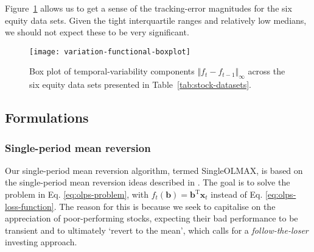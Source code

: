 Figure~\ref{fig:variation-functional-boxplot} allows us to get a sense of the tracking-error magnitudes for the six equity data sets. Given the tight interquartile ranges and relatively low medians, we should not expect these to be very significant.
\begin{figure}[H]
\caption{Box plot of temporal-variability components $\Vert f_t - f_{t-1} \Vert_\infty$ across the six equity data sets presented in Table~\ref{tab:stock-datasets}.}
\label{fig:variation-functional-boxplot}
\begin{center}
\texttt{[image: variation-functional-boxplot]}
\end{center}
\end{figure}

\subsection{Formulations}

\subsubsection{Single-period mean reversion}

Our single-period mean reversion algorithm, termed SingleOLMAX, is based on the single-period mean reversion ideas described in \citep[Section~4.1]{pamr}. The goal is to solve the problem in Eq. \eqref{eq:olps-problem}, with $f_t(\mathbf{b}) = \mathbf{b}^\text{T}\mathbf{x}_t$ instead of Eq. \eqref{eq:olps-loss-function}. The reason for this is because we seek to capitalise on the appreciation of poor-performing stocks, expecting their bad performance to be transient and to ultimately `revert to the mean', which calls for a \emph{follow-the-loser} investing approach.

